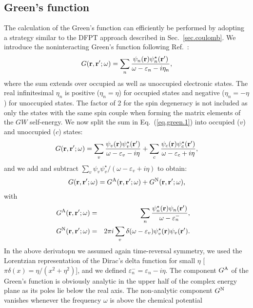 \documentclass[twocolumn,prb,showpacs,superscriptaddress]{revtex4}
\def\w{\omega}
\def\E{\varepsilon}
\def\r{{\bf r}}
\def\rp{{\bf r^\prime}}
\begin{document}
\subsection{Green's function}\label{sec.green}

The calculation of the Green's function can efficiently be performed 
by adopting a strategy similar to the DFPT approach
described in Sec.\ \ref{sec.coulomb}.
We introduce the noninteracting Green's function following Ref.\ :
  \begin{equation}\label{eq.green.1}
  G(\r,\rp;\w) = \sum_n \frac{\psi_n(\r)\psi_n^\star(\rp)}{\w-\E_n-i\eta_n},
  \end{equation}
where the sum extends over occupied as well as unoccupied electronic states.
The real infinitesimal $\eta_n$ is positive ($\eta_n=\eta$) 
for occupied states and negative ($\eta_n=-\eta$) for unoccupied states.\cite{hl,hl86}
The factor of 2 for the spin degeneracy is not included
as only the states with the same spin couple when forming the 
matrix elements of the $GW$ self-energy.\cite{hl86}
We now split the sum in Eq.~(\ref{eq.green.1}) into occupied ($v$) and unoccupied ($c$) states:
  \begin{equation}\label{eq.green.2}
  G(\r,\rp;\w) = \sum_v \frac{\psi_v(\r)\psi_v^\star(\rp)}{\w-\E_v-i\eta}
  + \sum_c \frac{\psi_c(\r)\psi_c^\star(\rp)}{\w-\E_c+i\eta},
  \end{equation}
and we add and subtract $\sum_v \psi_v\psi_v^\star/(\w-\E_v+i\eta)$ to obtain:
  \begin{equation}\label{eq.green.split}
  G(\r,\rp;\w) = G^{\rm A}(\r,\rp;\w) + G^{\rm N}(\r,\rp;\w),
  \end{equation}
with
  \begin{eqnarray}\label{eq.green.split.2}
\!\!\!\!\!\!  G^{\rm A}(\r,\rp;\w) & =&  \sum_n \frac{\psi_n^\star(\r)\psi_n(\rp)}{\w-\E_n^-},  \\ 
\!\!\!\!\!\!  G^{\rm N}(\r,\rp;\w)  & = &  2\pi i \sum_v \delta(\w-\E_v) \psi_v^\star(\r)\psi_v(\rp). \label{eq.green.split.3} 
  \end{eqnarray}
In the above derivatopn we assumed again time-reversal symmetry, we used the Lorentzian representation of the Dirac's delta function 
for small $\eta$ [$\pi\delta(x)=\eta/(x^2+\eta^2)$], and we defined $\E_n^- = \E_n - i\eta$.
The component $G^{\rm A}$ of the Green's function is obviously analytic in the
upper half of the complex energy plane as its poles lie below the real axis.
The non-analytic component $G^{\rm N}$ vanishes
whenever the frequency $\w$ is above the chemical potential 
\end{document}
